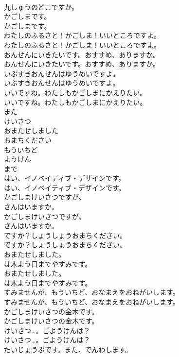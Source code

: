 \documentclass[8pt]{extreport}
\begin{document}
\begin{CJK}{UTF8}{min}
\\	九しゅうのどこですか。 
\\	かごしまです。	
\\	かごしまです。 
\\	わたしのふるさと！かごしま！いいところですよ。	
\\	わたしのふるさと！かごしま！いいところですよ。 
\\	おんせんにいきたいです。おすすめ、ありますか。	
\\	おんせんにいきたいです。おすすめ、ありますか。 
\\	いぶすきおんせんはゆうめいですよ。	
\\	いぶすきおんせんはゆうめいですよ。 
\\	いいですね。わたしもかごしまにかえりたい。	
\\	いいですね。わたしもかごしまにかえりたい。 
\\	また
\\	けいさつ
\\	おまたせしました
\\	おまちください
\\	もういちど
\\	ようけん
\\	まで
\\	はい、イノベイティブ・デザインです。	
\\	はい、イノベイティブ・デザインです。 
\\	かごしまけいさつですが、
\\	さんはいますか。	
\\	かごしまけいさつですが、
\\	さんはいますか。 
\\	ですか？しょうしょうおまちください。	
\\	ですか？しょうしょうおまちください。 
\\	おまたせしました。
\\	は木よう日までやすみです。	
\\	おまたせしました。
\\	は木よう日までやすみです。 
\\	すみませんが、もういちど、おなまえをおねがいします。	
\\	すみませんが、もういちど、おなまえをおねがいします。 
\\	かごしまけいさつの金木です。	
\\	かごしまけいさつの金木です。 
\\	けいさつ…。ごようけんは？	
\\	けいさつ…。ごようけんは？ 
\\	だいじょうぶです。また、でんわします。	

\end{CJK}
\end{document}
